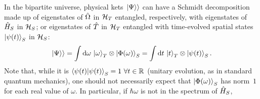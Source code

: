 In the bipartite universe, physical kets $\left.\left| \Psi \right\rangle\right\rangle$ can have a Schmidt decomposition
made up of
eigenstates of $\hat{\Omega}$ in $\mathcal{H}_T$
entangled, respectively, with
eigenstates of $\hat{H}_S$ in $\mathcal{H}_S$;
or eigenstates of $\hat{T}$ in $\mathcal{H}_T$
entangled with time-evolved spatial states~$\ket{\psi(t)}_S$ in $\mathcal{H}_S$:
\begin{equation}\label{eq:pw:time_freq_nomu}
  \left.\left| \Psi \right\rangle\right\rangle =
    \int \dd{\omega} \, \ket{\omega}_{T}\otimes\ket{\Phi(\omega)}_{S} =
    \int \dd{t} \, \ket{t}_{T} \otimes \ket{\psi(t)}_{S} \text{.}
\end{equation}
%
%
%
Note that,
while it is $\braket{\psi(t)}_S = 1 \ \forall t \in \mathbb{R}$ (unitary evolution,
as in standard quantum mechanics),
one should not necessarily expect that
$\ket{\Phi(\omega)}_S$ has norm~$1$ for each real value of $\omega$.
In particular, if $\hbar\omega$ is not in the spectrum of $\hat{H}_S$,
